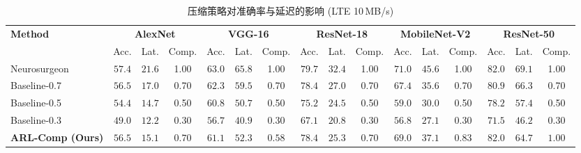 \begin{table}[htbp]
\centering
\caption{压缩策略对准确率与延迟的影响 (LTE 10\,MB/s)}
\label{tab:compression}
\small
\begin{tabular}{lccccccccccccccc}
\toprule
\textbf{Method} & \multicolumn{3}{c}{\textbf{AlexNet}} & \multicolumn{3}{c}{\textbf{VGG-16}} & \multicolumn{3}{c}{\textbf{ResNet-18}} & \multicolumn{3}{c}{\textbf{MobileNet-V2}} & \multicolumn{3}{c}{\textbf{ResNet-50}} \\
\cmidrule(lr){2-4}\cmidrule(lr){5-7}\cmidrule(lr){8-10}\cmidrule(lr){11-13}\cmidrule(lr){14-16}
 & Acc. & Lat. & Comp. & Acc. & Lat. & Comp. & Acc. & Lat. & Comp. & Acc. & Lat. & Comp. & Acc. & Lat. & Comp. \\
\midrule
Neurosurgeon & $57.4$ & $21.6$ & 1.00 & $63.0$ & $65.8$ & 1.00 & $79.7$ & $32.4$ & 1.00 & $71.0$ & $45.6$ & 1.00 & $82.0$ & $69.1$ & 1.00 \\
Baseline-0.7 & $56.5$ & $17.0$ & 0.70 & $62.3$ & $59.5$ & 0.70 & $78.4$ & $27.0$ & 0.70 & $67.4$ & $35.6$ & 0.70 & $80.9$ & $66.3$ & 0.70 \\
Baseline-0.5 & $54.4$ & $14.7$ & 0.50 & $60.8$ & $50.7$ & 0.50 & $75.2$ & $24.5$ & 0.50 & $59.0$ & $30.0$ & 0.50 & $78.2$ & $57.4$ & 0.50 \\
Baseline-0.3 & $49.0$ & $12.2$ & 0.30 & $56.7$ & $40.9$ & 0.30 & $67.1$ & $20.8$ & 0.30 & $56.8$ & $27.1$ & 0.30 & $71.5$ & $46.2$ & 0.30 \\
\textbf{ARL-Comp (Ours)} & $\mathbf{56.5}$ & $\mathbf{15.1}$ & $\mathbf{0.70}$ & $\mathbf{61.1}$ & $\mathbf{52.3}$ & $\mathbf{0.58}$ & $\mathbf{78.4}$ & $\mathbf{25.3}$ & $\mathbf{0.70}$ & $\mathbf{69.0}$ & $\mathbf{37.1}$ & $\mathbf{0.83}$ & $\mathbf{82.0}$ & $\mathbf{64.7}$ & $\mathbf{1.00}$ \\
\bottomrule
\end{tabular}
\end{table}